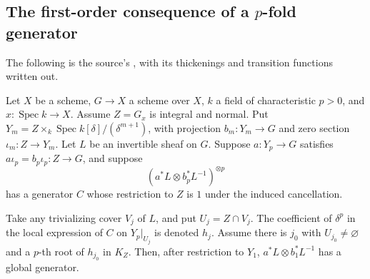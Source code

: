 \subsection{The first-order consequence of a \(p\)-fold generator}
\label{subsec:faithful-qam-core}

The following is the source's ,
with its thickenings and transition functions written out.

\begin{srlemma}\label{lem:faithful-qam-first-order}
Let \(X\) be a scheme, \(G\to X\) a scheme over \(X\),
\(k\) a field of characteristic \(p>0\), and
\(x:\operatorname{Spec}k\to X\).
Assume \(Z=G_x\) is integral and normal.
Put
\(Y_m=Z\times_k\operatorname{Spec}k[\delta]/(\delta^{m+1})\),
with projection \(b_m:Y_m\to G\) and zero section
\(\iota_m:Z\to Y_m\).
Let \(L\) be an invertible sheaf on \(G\).
Suppose \(a:Y_p\to G\) satisfies
\(a\iota_p=b_p\iota_p:Z\to G\), and suppose
\[
                    (a^*L\otimes b_p^*L^{-1})^{\otimes p}
\]
has a generator \(C\) whose restriction to \(Z\) is \(1\)
under the induced cancellation.

Take any trivializing cover \(V_j\) of \(L\), and put
\(U_j=Z\cap V_j\).
The coefficient of \(\delta^p\) in the local expression
of \(C\) on \(Y_p|_{U_j}\) is denoted \(h_j\).
Assume there is \(j_0\) with \(U_{j_0}\ne\varnothing\)
and a \(p\)-th root of \(h_{j_0}\) in \(K_Z\).
Then, after restriction to \(Y_1\),
\(a^*L\otimes b_1^*L^{-1}\) has a global generator.
\end{srlemma}
